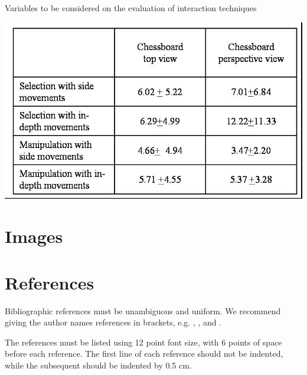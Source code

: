 \documentclass[12pt]{article}
\begin{document}
\begin{table}[ht]
\centering
\caption{Variables to be considered on the evaluation of interaction
  techniques}
\label{tab:exTable1}
\includegraphics[width=.7\textwidth]{table.jpg}
\end{table}

\section{Images}



\section{References}

Bibliographic references must be unambiguous and uniform.  We recommend giving
the author names references in brackets, e.g. \cite{knuth:84},
\cite{boulic:91}, and \cite{smith:99}.

The references must be listed using 12 point font size, with 6 points of space
before each reference. The first line of each reference should not be
indented, while the subsequent should be indented by 0.5 cm.



\end{document}
